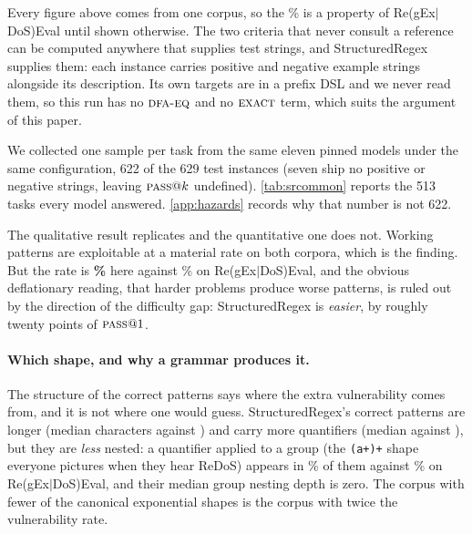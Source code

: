 \documentclass[11pt]{article}
\newcommand{\pass}{\textsc{pass}}
\newcommand{\dfaeq}{\textsc{dfa-eq}}
\newcommand{\exact}{\textsc{exact}}
\begin{document}
Every figure above comes from one corpus, so the \vulngivencorrect{}\% is a property of
Re(gEx$|$DoS)Eval until shown otherwise. The two criteria that never consult
a reference can be computed anywhere that supplies test strings, and
StructuredRegex~\citep{ye2020structuredregex} supplies them: each instance
carries positive and negative example strings alongside its description. Its
own targets are in a prefix DSL and we never read them, so this run has no
$\dfaeq{}$ and no $\exact{}$ term, which suits the argument of this paper.

We collected one sample per task from the same eleven pinned models under the
same configuration, 622 of the 629 test instances (seven ship no positive or
negative strings, leaving $\pass{}@k$ undefined).
\cref{tab:srcommon} reports the 513 tasks every model answered.
\cref{app:hazards} records why that number is not 622.

\begin{table}[htbp]
\centering
\small

\caption{StructuredRegex, one sample per task, on the 513 instances answered
by all eleven models. Percentages. Intervals are Wilson binomial, which is
appropriate here in a way it is not in \cref{tab:main}: this is one sample per
task, so there is no within-task resampling for a bootstrap to exploit. The
last column is the share of functionally correct patterns that are
ReDoS-vulnerable, the same quantity this paper reports as
\vulngivencorrect{}\% on Re(gEx$|$DoS)Eval.}
\label{tab:srcommon}
\end{table}

\begin{table}[htbp]
\centering
\small

\caption{The two reference-independent criteria across both corpora, at
$@1$ in each so the comparison is like for like.}
\label{tab:srcompare}
\end{table}

The qualitative result replicates and the quantitative one does not. Working
patterns are exploitable at a material rate on both corpora, which is the
finding. But the rate is \textbf{\srvulngivencorrect{}\%} here against
\vulngivencorrect{}\% on Re(gEx$|$DoS)Eval, and the obvious deflationary
reading, that harder problems produce worse patterns, is ruled out by the
direction of the difficulty gap: StructuredRegex is \emph{easier}, by roughly
twenty points of $\pass{}@1$.

\paragraph{Which shape, and why a grammar produces it.} The structure of the
correct patterns says where the extra vulnerability comes from, and it is not
where one would guess. StructuredRegex's correct patterns are longer (median
\srlen{} characters against \relen{}) and carry more quantifiers (median
\srquant{} against \requant{}), but they are \emph{less} nested: a quantifier
applied to a group (the \texttt{(a+)+} shape everyone pictures when they
hear ReDoS) appears in \srqgrouppct{}\% of them against \reqgrouppct{}\% on
Re(gEx$|$DoS)Eval, and their median group nesting depth is zero. The corpus
with fewer of the canonical exponential shapes is the corpus with twice the
vulnerability rate.
\end{document}
